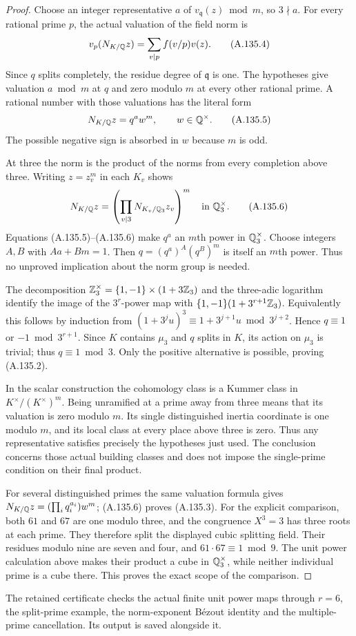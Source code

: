 \begin{proof}
Choose an integer representative \(a\) of
\(v_{\mathfrak q}(z)\bmod m\), so \(3\nmid a\).
For every rational prime \(p\), the actual
valuation of the field norm is
\[
            v_p(N_{K/\mathbb Q}z)
                      =\sum_{v\mid p}f(v/p)v(z).
 \tag{A.135.4}
\]
Since \(q\) splits completely, the residue degree
of \(\mathfrak q\) is one.  The hypotheses give
valuation \(a\bmod m\) at \(q\) and zero modulo
\(m\) at every other rational prime.
A rational number with those valuations has the
literal form
\[
                       N_{K/\mathbb Q}z=q^a w^m,
                                 \qquad w\in\mathbb Q^\times.
 \tag{A.135.5}
\]
The possible negative sign is absorbed in \(w\)
because \(m\) is odd.

At three the norm is the product of the norms
from every completion above three.
Writing \(z=z_v^m\) in each \(K_v\) shows
\[
       N_{K/\mathbb Q}z
             =\left(\prod_{v\mid3}N_{K_v/\mathbb Q_3}z_v\right)^m
                                  \quad\text{in }\mathbb Q_3^\times.
 \tag{A.135.6}
\]
Equations (A.135.5)--(A.135.6) make \(q^a\) an
\(m\)th power in \(\mathbb Q_3^\times\).
Choose integers \(A,B\) with \(Aa+Bm=1\).
Then \(q=(q^a)^A(q^B)^m\) is itself an \(m\)th
power.  Thus no unproved implication about the
norm group is needed.

The decomposition
\(\mathbb Z_3^\times=\{1,-1\}\times(1+3\mathbb Z_3)\)
and the three-adic logarithm identify the image
of the \(3^r\)-power map with
\(\{1,-1\}(1+3^{r+1}\mathbb Z_3)\).
Equivalently this follows by induction from
\((1+3^j u)^3\equiv1+3^{j+1}u\bmod3^{j+2}\).
Hence \(q\equiv1\) or \(-1\bmod3^{r+1}\).
Since \(K\) contains \(\mu_3\) and \(q\) splits
in \(K\), its action on \(\mu_3\) is trivial;
thus \(q\equiv1\bmod3\).
Only the positive alternative is possible,
proving (A.135.2).

In the scalar construction the cohomology class
is a Kummer class in \(K^\times/(K^\times)^m\).
Being unramified at a prime away from three
means that its valuation is zero modulo \(m\).
Its single distinguished inertia coordinate is
one modulo \(m\), and its local class at every
place above three is zero.  Thus any representative
satisfies precisely the hypotheses just used.
The conclusion concerns those actual building
classes and does not impose the single-prime
condition on their final product.

For several distinguished primes the same
valuation formula gives
\(N_{K/\mathbb Q}z=(\prod_iq_i^{a_i})w^m\);
(A.135.6) proves (A.135.3).
For the explicit comparison, both \(61\) and
\(67\) are one modulo three, and the congruence
\(X^3=3\) has three roots at each prime.
They therefore split the displayed cubic
splitting field.  Their residues modulo nine
are seven and four, and
\(61\cdot67\equiv1\bmod9\).
The unit power calculation above makes their
product a cube in \(\mathbb Q_3^\times\), while neither
individual prime is a cube there.
This proves the exact scope of the comparison.
\end{proof}

The retained certificate
checks the actual finite unit power maps through
\(r=6\), the split-prime example, the norm-exponent
B\'ezout identity and the multiple-prime cancellation.
Its output is saved alongside it.
